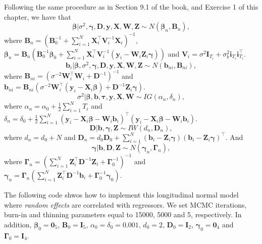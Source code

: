 \begin{enumerate}[leftmargin=*]
Following the same procedure as in Section 9.1 of the book, and Exercise 1 of this chapter, we have that
\begin{equation*}
	\bm{\beta}|\sigma^2,\bm{\gamma},\bm{D},\bm{y}, \bm{X}, \bm{W}, \bm{Z} \sim {N}(\bm{\beta}_n,\bm{B}_n), 
\end{equation*}
where $\bm{B}_n = (\bm{B}_0^{-1} +\sum_{i=1}^N \bm{X}_i^{\top}\bm{V}_i^{-1}\bm{X}_i)^{-1}$, $\bm{\beta}_n= \bm{B}_n(\bm{B}_0^{-1}\bm{\beta}_0 + \sum_{i=1}^N\bm{X}_i^{\top}\bm{V}_i^{-1}(\bm{y}_i-\bm{W}_i\bm{Z}_i\bm{\gamma}))$ and $\bm{V}_i=\sigma^2\bm{I}_{T_i}+\sigma_{b}^2\bm{i}_{T_i}\bm{i}_{T_i}^{\top}$.
\begin{equation*}
	\bm{b}_i|\bm{\beta},\sigma^2,\bm{\gamma},\bm{D},\bm{y}, \bm{X}, \bm{W}, \bm{Z} \sim {N}(\bm{b}_{ni},\bm{B}_{ni}), 
\end{equation*} 
where $\bm{B}_{ni}=(\sigma^{-2}\bm{W}_i^{\top}\bm{W}_i+\bm{D}^{-1})^{-1}$ and $\bm{b}_{ni}=\bm{B}_{ni}(\sigma^{-2}\bm{W}_i^{\top}(\bm{y}_i-\bm{X}_i\bm{\beta})+\bm{D}^{-1}\bm{Z}_i\bm{\gamma})$.
\begin{equation*}
	\sigma^2| \bm{\beta}, \bm{b}, \bm{\tau}, \bm{y}, \bm{X}, \bm{W} \sim {I}{G}(\alpha_n, \delta_n),
\end{equation*}
where $\alpha_n=\alpha_0+\frac{1}{2}\sum_{i=1}^N T_i$ and $\delta_n=\delta_0+\frac{1}{2}\sum_{i=1}^N(\bm{y}_i-\bm{X}_i\bm{\beta}-\bm{W}_i\bm{b}_i)^{\top}(\bm{y}_i-\bm{X}_i\bm{\beta}-\bm{W}_i\bm{b}_i)$.  
\begin{equation*}
	\bm{D}| \bm{b}, \bm{\gamma}, \bm{Z} \sim {I}{W}(d_n, \bm{D}_n),
\end{equation*}
where $d_n=d_0+N$ and $\bm{D}_n=d_0\bm{D}_0+\sum_{i=1}^N(\bm{b}_i-\bm{Z}_i\bm{\gamma})(\bm{b}_i-\bm{Z}_i\bm{\gamma})^{\top}$. And
\begin{equation*}
	\bm{\gamma}|\bm{b}, \bm{D}, \bm{Z}\sim {N}(\bm{\gamma}_n,\bm{\Gamma}_n),
\end{equation*}
where $\bm{\Gamma}_n=(\sum_{i=1}^N \bm{Z}_i^{\top}\bm{D}^{-1}\bm{Z}_i+\bm{\Gamma}_0^{-1})^{-1}$ and $\bm{\gamma}_n=\bm{\Gamma}_n(\sum_{i=1}^N \bm{Z}_i^{\top}\bm{D}^{-1}\bm{b}_i+\bm{\Gamma}_0^{-1}\bm{\gamma}_0)$.

The following code shwos how to implement this longitudinal normal model where \textit{random effects} are correlated with regressors. We set MCMC iterations, burn-in and thinning parameters equal to 15000, 5000 and 5, respectively. In addition, $\bm{\beta}_0=\bm{0}_5$, $\bm{B}_0=\bm{I}_5$, $\alpha_0=\delta_0=0.001$, $d_0=2$, $\bm{D}_0=\bm{I}_2$, $\bm{\gamma}_0=\bm{0}_4$ and $\bm{\Gamma}_0=\bm{I}_4$.



\end{enumerate}
